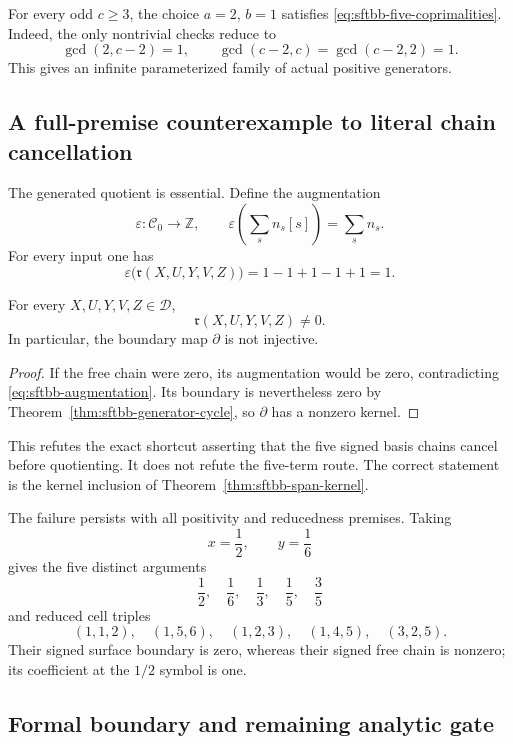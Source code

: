 For every odd $c\geq3$, the choice $a=2$, $b=1$ satisfies
\eqref{eq:sftbb-five-coprimalities}.  Indeed, the only nontrivial checks
reduce to
\[
 \gcd(2,c-2)=1,
 \qquad
 \gcd(c-2,c)=\gcd(c-2,2)=1.
\]
This gives an infinite parameterized family of actual positive generators.

\subsection{A full-premise counterexample to literal chain cancellation}

The generated quotient is essential.  Define the augmentation
\[
 \varepsilon:\mathcal C_0\longrightarrow\mathbb Z,
 \qquad
 \varepsilon\left(\sum_sn_s[s]\right)=\sum_sn_s.
\]
For every input one has
\begin{equation}
 \varepsilon\bigl(\mathfrak r(X,U,Y,V,Z)\bigr)
 =1-1+1-1+1=1.
 \label{eq:sftbb-augmentation}
\end{equation}

\begin{proposition}
\label{prop:sftbb-generator-nonzero}
For every $X,U,Y,V,Z\in\mathcal D$,
\[
 \mathfrak r(X,U,Y,V,Z)\neq0.
\]
In particular, the boundary map $\partial$ is not injective.
\end{proposition}

\begin{proof}
If the free chain were zero, its augmentation would be zero, contradicting
\eqref{eq:sftbb-augmentation}.  Its boundary is nevertheless zero by
Theorem~\ref{thm:sftbb-generator-cycle}, so $\partial$ has a nonzero kernel.
\end{proof}

This refutes the exact shortcut asserting that the five signed basis chains
cancel before quotienting.  It does not refute the five-term route.  The
correct statement is the kernel inclusion of
Theorem~\ref{thm:sftbb-span-kernel}.

The failure persists with all positivity and reducedness premises.  Taking
\[
 x=\frac12,\qquad y=\frac16
\]
gives the five distinct arguments
\[
 \frac12,\quad\frac16,\quad\frac13,\quad\frac15,
 \quad\frac35
\]
and reduced cell triples
\[
 (1,1,2),\quad(1,5,6),\quad(1,2,3),\quad(1,4,5),
 \quad(3,2,5).
\]
Their signed surface boundary is zero, whereas their signed free chain is
nonzero; its coefficient at the $1/2$ symbol is one.

\subsection{Formal boundary and remaining analytic gate}

